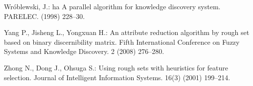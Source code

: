 \documentclass[11pt]{article}   %
\begin{document}
\begin{thebibliography}{}
	Wr\'oblewski, J.: ha
	A parallel algorithm for knowledge discovery system.
	PARELEC. (1998) 228--30.

	Yang P., Jisheng L., Yongxuan H.:
	An attribute reduction algorithm by rough set based on binary discernibility matrix.
	Fifth International Conference on Fuzzy Systems and Knowledge Discovery. 2 (2008) 276--280.
	
	Zhong N., Dong J., Ohsuga S.:
	Using rough sets with heuristics for feature selection.
	Journal of Intelligent Information Systems. 16(3) (2001) 199--214.


			
%
%

\end{thebibliography}
\end{document}
